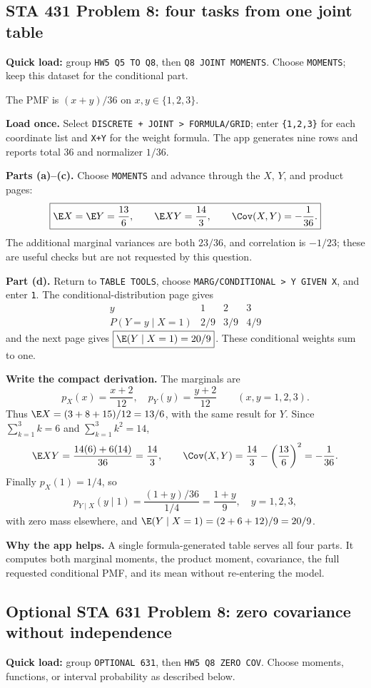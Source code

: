 \subsection{STA 431 Problem 8: four tasks from one joint table}
\textbf{Quick load:} group \texttt{HW5 Q5 TO Q8}, then \texttt{Q8 JOINT MOMENTS}. Choose \texttt{MOMENTS}; keep this dataset for the conditional part.

The PMF is $(x+y)/36$ on $x,y\in\{1,2,3\}$.

\textbf{Load once.} Select \texttt{DISCRETE + JOINT > FORMULA/GRID}; enter \texttt{\{1,2,3\}} for each coordinate list and \texttt{X+Y} for the weight formula. The app generates nine rows and reports total 36 and normalizer $1/36$.

\textbf{Parts (a)--(c).} Choose \texttt{MOMENTS} and advance through the $X$, $Y$, and product pages:
\[
\boxed{\E X=\E Y=\frac{13}{6},\qquad \E XY=\frac{14}{3},\qquad \Cov(X,Y)=-\frac1{36}.}
\]
The additional marginal variances are both $23/36$, and correlation is $-1/23$; these are useful checks but are not requested by this question.

\textbf{Part (d).} Return to \texttt{TABLE TOOLS}, choose \texttt{MARG/CONDITIONAL > Y GIVEN X}, and enter \texttt{1}. The conditional-distribution page gives
\[
\begin{array}{c|ccc}
y&1&2&3\\\hline
P(Y=y\mid X=1)&2/9&3/9&4/9
\end{array}
\]
and the next page gives $\boxed{\E(Y\mid X=1)=20/9}$. These conditional weights sum to one.

\textbf{Write the compact derivation.} The marginals are
\[
p_X(x)=\frac{x+2}{12},\quad p_Y(y)=\frac{y+2}{12}\qquad(x,y=1,2,3).
\]
Thus $\E X=(3+8+15)/12=13/6$, with the same result for $Y$. Since $\sum_{k=1}^3k=6$ and $\sum_{k=1}^3k^2=14$,
\[
\E XY=\frac{14(6)+6(14)}{36}=\frac{14}{3},\qquad
\Cov(X,Y)=\frac{14}{3}-\left(\frac{13}{6}\right)^2=-\frac1{36}.
\]
Finally $p_X(1)=1/4$, so
\[
p_{Y\mid X}(y\mid1)=\frac{(1+y)/36}{1/4}=\frac{1+y}{9},\quad y=1,2,3,
\]
with zero mass elsewhere, and $\E(Y\mid X=1)=(2+6+12)/9=20/9$.

\textbf{Why the app helps.} A single formula-generated table serves all four parts. It computes both marginal moments, the product moment, covariance, the full requested conditional PMF, and its mean without re-entering the model.

\subsection{Optional STA 631 Problem 8: zero covariance without independence}
\textbf{Quick load:} group \texttt{OPTIONAL 631}, then \texttt{HW5 Q8 ZERO COV}. Choose moments, functions, or interval probability as described below.


